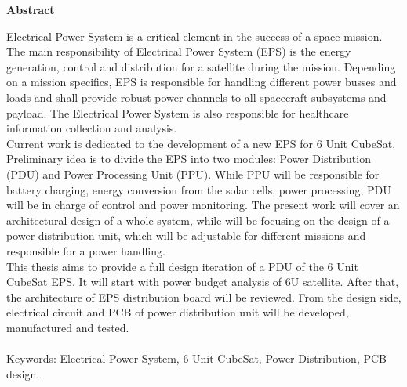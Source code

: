 \thispagestyle{empty}
\vspace*{1.0cm}

\begin{center}
    \textbf{Abstract}
\end{center}

\vspace*{0.5cm}

\noindent

Electrical Power System is a critical element in the success of a space mission. The main responsibility of Electrical Power System (EPS) is the energy generation, control and distribution for a satellite during the mission. Depending on a mission specifics, EPS is responsible for handling different power busses and loads and shall provide robust power channels to all spacecraft subsystems and payload. The Electrical Power System is also responsible for healthcare information collection and analysis. 
\\

Current work is dedicated to the development of a new EPS for 6 Unit CubeSat. Preliminary idea is to divide the EPS into two modules: Power Distribution (PDU) and Power Processing Unit (PPU). While PPU will be responsible for battery charging, energy conversion from the solar cells, power processing, PDU will be in charge of control and power monitoring. The present work will cover an architectural design of a whole system, while will be focusing on the design of a power distribution unit, which will be adjustable for different missions and responsible for a power handling.
\\

This thesis aims to provide a full design iteration of a PDU of the 6 Unit CubeSat EPS. It will start with power budget analysis of 6U satellite. After that, the architecture of EPS distribution board will be reviewed. From the design side, electrical circuit and PCB of power distribution unit will be developed, manufactured and tested.
\\
\\
Keywords: Electrical Power System, 6 Unit CubeSat, Power Distribution, PCB design.